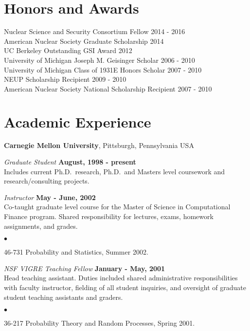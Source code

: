 \documentclass[margin,line]{res}
\newenvironment{list2}{
  \begin{list}{$\bullet$}{%
      \setlength{\itemsep}{0in}
      \setlength{\parsep}{0in} \setlength{\parskip}{0in}
      \setlength{\topsep}{0in} \setlength{\partopsep}{0in} 
      \setlength{\leftmargin}{0.2in}}}{\end{list}}
\begin{document}
\begin{resume}
\section{\sc Honors and Awards} 

Nuclear Science and Security Consortium Fellow \hfill 2014 - 2016 \\
American Nuclear Society Graduate Scholarship \hfill 2014 \\
UC Berkeley Outstanding GSI Award \hfill 2012 \\
University of Michigan Joseph M. Geisinger Scholar \hfill 2006 - 2010 \\
University of Michigan Class of 1931E Honors Scholar \hfill 2007 - 2010 \\
NEUP Scholarship Recipient \hfill 2009 - 2010 \\
American Nuclear Society National Scholarship Recipient \hfill 2007 - 2010 \\

\section{\sc Academic Experience}
{\bf Carnegie Mellon University}, Pittsburgh, Pennsylvania USA

\vspace{-.3cm}
{\em Graduate Student} \hfill {\bf August, 1998 - present}\\
Includes current Ph.D.~research, Ph.D.~and Masters level coursework and
research/consulting projects.

{\em Instructor} \hfill {\bf May - June, 2002}\\
Co-taught graduate level course for the Master of Science in
Computational Finance program.  Shared responsibility for lectures, exams,
homework assignments, and  grades.  
\vspace*{.05in}  
\begin{list2}
\item 46-731 Probability and Statistics, Summer 2002.
\end{list2}


{\em NSF VIGRE Teaching Fellow} \hfill {\bf January - May, 2001}\\
Head teaching assistant.   
Duties included  shared administrative responsibilities with faculty
instructor, fielding of all student inquiries, and oversight of
graduate student teaching assistants and graders.
\vspace*{.05in}  
\begin{list2}
\item 36-217 Probability Theory and Random Processes, Spring 2001.
\end{list2}


\end{resume}
\end{document}
